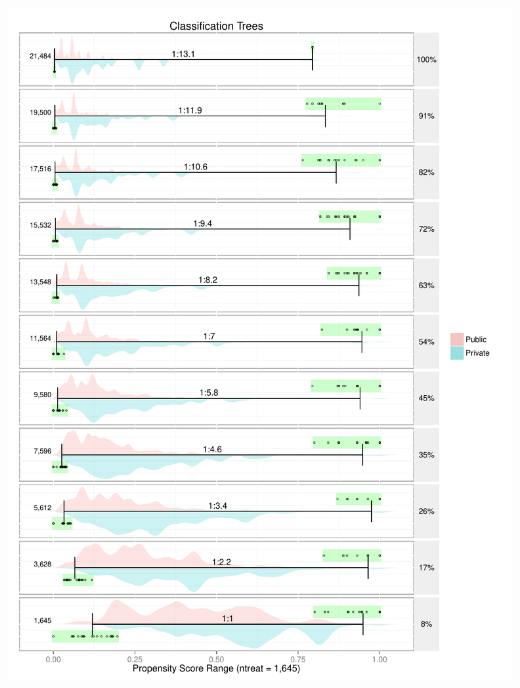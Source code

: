 \documentclass[10pt,handout,mathserif]{beamer}
\begin{document}
\begin{frame}[c]
\begin{columns}
\begin{column}{0.5\textwidth}
\begin{center}
    	\includegraphics[height=\textheight,keepaspectratio]{../Figures/PSRanges-tree-PISA}
    	\end{center}
	\end{column}
	\end{columns}
\end{frame}
\end{document}
